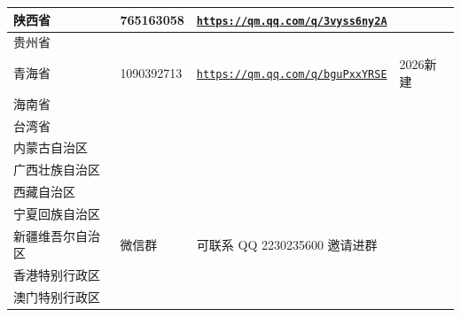 \documentclass[UTF8,fontset=none,zihao=-4]{ctexart}
\newcommand{\grouplink}[1]{\href{#1}{\nolinkurl{#1}}}
\begin{document}
\begin{center}
{\begin{tabular}{|C{38mm}|C{36mm}|C{85mm}|C{22mm}|}
\hline
陕西省 & 765163058 & \grouplink{https://qm.qq.com/q/3vyss6ny2A} & \\
\hline
贵州省 & & & \\
\hline
青海省 & 1090392713 & \grouplink{https://qm.qq.com/q/bguPxxYRSE} & 2026新建\\
\hline
海南省 & & & \\
\hline
台湾省 & & & \\
\hline
内蒙古自治区 & & & \\
\hline
广西壮族自治区 & & & \\
\hline
西藏自治区 & & & \\
\hline
宁夏回族自治区 & & & \\
\hline
新疆维吾尔自治区 & 微信群 & 可联系 QQ 2230235600 邀请进群 & \\
\hline
香港特别行政区 & & & \\
\hline
澳门特别行政区 & & & \\
\hline
\end{tabular}
}

\end{center}
\end{document}
